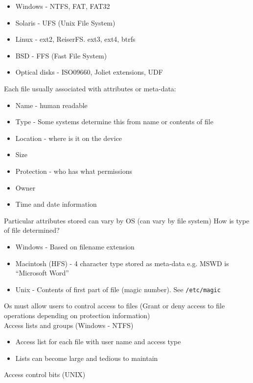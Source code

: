 \documentclass[number]{notes}
\begin{document}
\begin{landscape}
\begin{multicols}{3}
\begin{itemize}[nolistsep]
    \item Windows - NTFS, FAT, FAT32
    \item Solaris - UFS (Unix File System)
    \item Linux - ext2, ReiserFS. ext3, ext4, btrfs
    \item BSD - FFS (Fast File System)
    \item Optical disks - ISO09660, Joliet extensions, UDF
\end{itemize}
Each file usually associated with attributes or meta-data:
\begin{itemize}[nolistsep]
    \item Name - human readable
    \item Type - Some systems determine this from name or contents of file
    \item Location - where is it on the device
    \item Size
    \item Protection - who has what permissions
    \item Owner
    \item Time and date information
\end{itemize}
Particular attributes stored can vary by OS (can vary by file system)
How is type of file determined?
\begin{itemize}[nolistsep]
    \item Windows - Based on filename extension
    \item Macintosh (HFS) - 4 character type stored as meta-data e.g. MSWD is ``Microsoft Word''
    \item Unix - Contents of first part of file (magic number). See \texttt{/etc/magic}
\end{itemize}
Os must allow users to control access to files (Grant or deny access to file operations depending on protection information)\\
Access lists and groups (Windows - NTFS)
\begin{itemize}[nolistsep]
    \item Access list for each file with user name and access type
    \item Lists can become large and tedious to maintain
\end{itemize}
Access control bits (UNIX)
\begin{itemize}[nolistsep]

\end{itemize}
\end{multicols}
\end{landscape}
\end{document}
